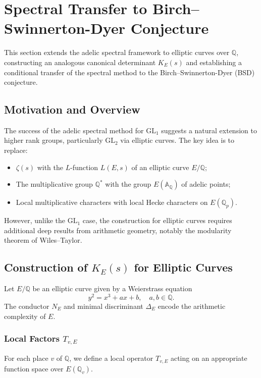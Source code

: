 \section{Spectral Transfer to Birch–Swinnerton-Dyer Conjecture}

This section extends the adelic spectral framework to elliptic curves over $\mathbb{Q}$, constructing an analogous canonical determinant $K_E(s)$ and establishing a conditional transfer of the spectral method to the Birch–Swinnerton-Dyer (BSD) conjecture.

\subsection{Motivation and Overview}

The success of the adelic spectral method for $\mathrm{GL}_1$ suggests a natural extension to higher rank groups, particularly $\mathrm{GL}_2$ via elliptic curves. The key idea is to replace:
\begin{itemize}
\item $\zeta(s)$ with the $L$-function $L(E, s)$ of an elliptic curve $E/\mathbb{Q}$;
\item The multiplicative group $\mathbb{Q}^*$ with the group $E(\mathbb{A}_{\mathbb{Q}})$ of adelic points;
\item Local multiplicative characters with local Hecke characters on $E(\mathbb{Q}_p)$.
\end{itemize}

However, unlike the $\mathrm{GL}_1$ case, the construction for elliptic curves requires additional deep results from arithmetic geometry, notably the modularity theorem of Wiles–Taylor.

\subsection{Construction of $K_E(s)$ for Elliptic Curves}

Let $E/\mathbb{Q}$ be an elliptic curve given by a Weierstrass equation
\[
y^2 = x^3 + ax + b, \quad a, b \in \mathbb{Q}.
\]
The conductor $N_E$ and minimal discriminant $\Delta_E$ encode the arithmetic complexity of $E$.

\subsubsection{Local Factors $T_{v,E}$}

For each place $v$ of $\mathbb{Q}$, we define a local operator $T_{v,E}$ acting on an appropriate function space over $E(\mathbb{Q}_v)$.

